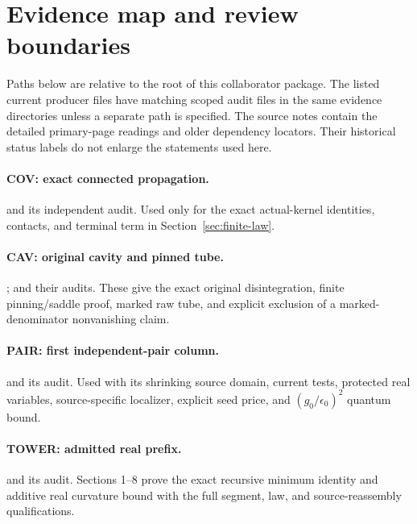 \appendix
\section{Evidence map and review boundaries}

Paths below are relative to the root of this collaborator package. The listed current producer files have matching scoped audit files in the same evidence directories unless a separate path is specified. The source notes contain the detailed primary-page readings and older dependency locators. Their historical status labels do not enlarge the statements used here.

\paragraph{COV: exact connected propagation.}
 and its independent audit. Used only for the exact actual-kernel identities, contacts, and terminal term in Section~\ref{sec:finite-law}.

\paragraph{CAV: original cavity and pinned tube.}
;
 and their audits. These give the exact original disintegration, finite pinning/saddle proof, marked raw tube, and explicit exclusion of a marked-denominator nonvanishing claim.

\paragraph{PAIR: first independent-pair column.}
 and its audit. Used with its shrinking source domain, current tests, protected real variables, source-specific localizer, explicit seed price, and $(g_0/\epsilon_0)^2$ quantum bound.

\paragraph{TOWER: admitted real prefix.}
 and its audit. Sections 1--8 prove the exact recursive minimum identity and additive real curvature bound with the full segment, law, and source-reassembly qualifications.

